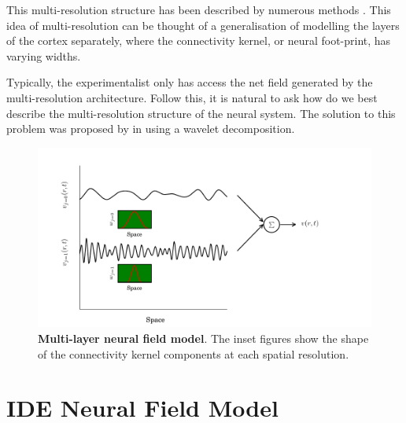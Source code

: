 \documentclass[11pt,draftcls,onecolumn,peerreview]{IEEEtran}
\begin{document}
This multi-resolution structure has been described by numerous methods \cite{Wilson1973}. This idea of multi-resolution can be thought of a generalisation of modelling the layers of the cortex separately, where the connectivity kernel, or neural foot-print, has varying widths.

Typically, the experimentalist only has access the net field generated by the multi-resolution architecture. Follow this, it is natural to ask how do we best describe the multi-resolution structure of the neural system. The solution to this problem was proposed by \cite{Breakspear2005} in using a wavelet decomposition.  
\begin{figure}[t]
	\centering
		\includegraphics[scale=1]{./Graph/MultiResNeuralField.pdf}
	\caption{{\bf Multi-layer neural field model}. The inset figures show the shape of the
connectivity kernel components at each spatial resolution.}
	\label{fig:MultiLayerFieldModel}
\end{figure}

\section{IDE Neural Field Model}
\end{document}

